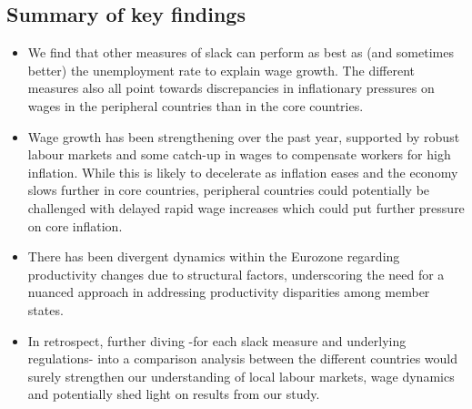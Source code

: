 \subsection{Summary of key findings}
\begin{itemize}
    \item We find that other measures of slack can perform as best as (and sometimes better) the unemployment rate to explain wage growth. The different measures also all point towards discrepancies in inflationary pressures on wages in the peripheral countries than in the core countries.
    \item Wage growth has been strengthening over the past year, supported by robust labour markets and some catch-up in wages to compensate workers for high inflation. While this is likely to decelerate as inflation eases and the economy slows further in core countries, peripheral countries could potentially be challenged with delayed rapid wage increases which could put further pressure on core inflation.
    \item There has been divergent dynamics within the Eurozone regarding productivity changes due to structural factors, underscoring the need for a nuanced approach in addressing productivity disparities among member states.
    \item In retrospect, further diving -for each slack measure and underlying regulations- into a comparison analysis between the different countries would surely strengthen our understanding of local labour markets, wage dynamics and potentially shed light on results from our study.
\end{itemize}